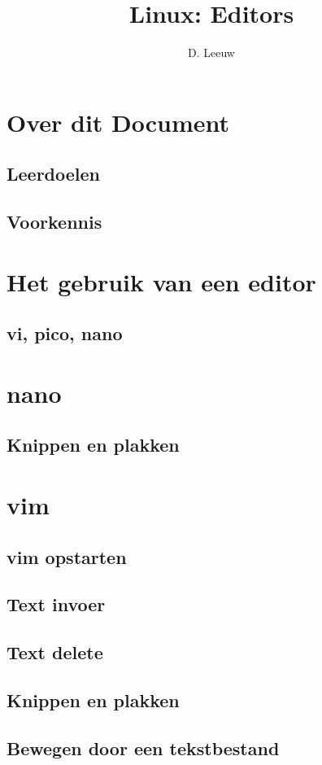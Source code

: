 \documentclass[a4paper,12pt,twoside,openright,titlepage]{article}
\author{D. Leeuw}
\title{Linux: Editors}
\date{\today\\
1.1.0\\
\vfill
\raggedright
\copyright\ 2020-2026 Dennis Leeuw\\
}
\begin{document}

\maketitle


\section{Over dit Document}
\subsection{Leerdoelen}

\subsection{Voorkennis}



\section{Het gebruik van een editor}

\subsection{vi, pico, nano}


\section{nano}

\subsection{Knippen en plakken}


\section{vim}

\subsection{vim opstarten}

\subsection{Text invoer}

\subsection{Text delete}

\subsection{Knippen en plakken}

\subsection{Bewegen door een tekstbestand}



\printindex
\end{document}
